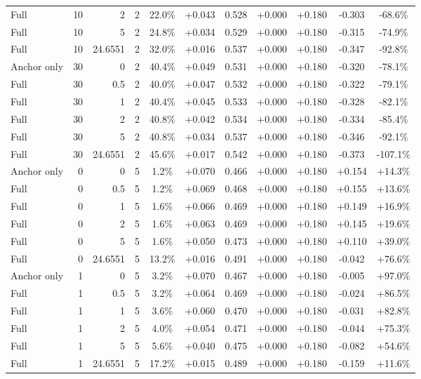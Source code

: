 \begin{table}[htbp]
\begin{tabular}{lrrrccccccc}
Full & 10 & 2 & 2 & 22.0\% & +0.043 & 0.528 & +0.000 & +0.180 & -0.303 & -68.6\% \\
Full & 10 & 5 & 2 & 24.8\% & +0.034 & 0.529 & +0.000 & +0.180 & -0.315 & -74.9\% \\
Full & 10 & 24.6551 & 2 & 32.0\% & +0.016 & 0.537 & +0.000 & +0.180 & -0.347 & -92.8\% \\
Anchor only & 30 & 0 & 2 & 40.4\% & +0.049 & 0.531 & +0.000 & +0.180 & -0.320 & -78.1\% \\
Full & 30 & 0.5 & 2 & 40.0\% & +0.047 & 0.532 & +0.000 & +0.180 & -0.322 & -79.1\% \\
Full & 30 & 1 & 2 & 40.4\% & +0.045 & 0.533 & +0.000 & +0.180 & -0.328 & -82.1\% \\
Full & 30 & 2 & 2 & 40.8\% & +0.042 & 0.534 & +0.000 & +0.180 & -0.334 & -85.4\% \\
Full & 30 & 5 & 2 & 40.8\% & +0.034 & 0.537 & +0.000 & +0.180 & -0.346 & -92.1\% \\
Full & 30 & 24.6551 & 2 & 45.6\% & +0.017 & 0.542 & +0.000 & +0.180 & -0.373 & -107.1\% \\
Anchor only & 0 & 0 & 5 & 1.2\% & +0.070 & 0.466 & +0.000 & +0.180 & +0.154 & +14.3\% \\
Full & 0 & 0.5 & 5 & 1.2\% & +0.069 & 0.468 & +0.000 & +0.180 & +0.155 & +13.6\% \\
Full & 0 & 1 & 5 & 1.6\% & +0.066 & 0.469 & +0.000 & +0.180 & +0.149 & +16.9\% \\
Full & 0 & 2 & 5 & 1.6\% & +0.063 & 0.469 & +0.000 & +0.180 & +0.145 & +19.6\% \\
Full & 0 & 5 & 5 & 1.6\% & +0.050 & 0.473 & +0.000 & +0.180 & +0.110 & +39.0\% \\
Full & 0 & 24.6551 & 5 & 13.2\% & +0.016 & 0.491 & +0.000 & +0.180 & -0.042 & +76.6\% \\
Anchor only & 1 & 0 & 5 & 3.2\% & +0.070 & 0.467 & +0.000 & +0.180 & -0.005 & +97.0\% \\
Full & 1 & 0.5 & 5 & 3.2\% & +0.064 & 0.469 & +0.000 & +0.180 & -0.024 & +86.5\% \\
Full & 1 & 1 & 5 & 3.6\% & +0.060 & 0.470 & +0.000 & +0.180 & -0.031 & +82.8\% \\
Full & 1 & 2 & 5 & 4.0\% & +0.054 & 0.471 & +0.000 & +0.180 & -0.044 & +75.3\% \\
Full & 1 & 5 & 5 & 5.6\% & +0.040 & 0.475 & +0.000 & +0.180 & -0.082 & +54.6\% \\
Full & 1 & 24.6551 & 5 & 17.2\% & +0.015 & 0.489 & +0.000 & +0.180 & -0.159 & +11.6\% \\

\end{tabular}
\end{table}
